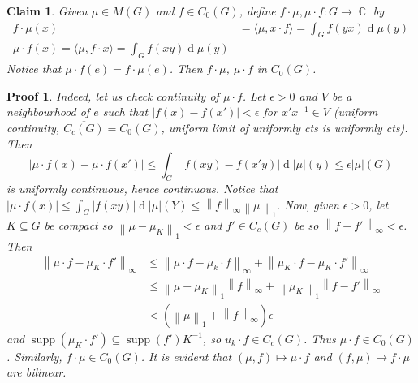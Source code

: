 \documentclass[11pt, a4paper]{memoir}
\DeclareMathOperator{\C}{{\mathbb{C}}}
\newcommand{\norm}[1]{\ensuremath{\left\lVert#1\right\rVert}}
\theoremstyle{change}
\theoremstyle{plain}
\newtheorem{claim}{Claim}
\theoremstyle{nonumberplain}
\newtheorem{nmproof}{Proof}
\DeclareMathOperator{\supp}{supp}
\renewcommand{\d}[1]{\ensuremath{\operatorname{d}\!{#1}}}
\numberwithin{equation}{section}
\begin{document}
\begin{claim}
    Given $\mu\in M(G)$ and $f\in C_0(G)$, define $f\cdot\mu,\mu\cdot f:G\to\C$ by
    \begin{align*}
        f\cdot\mu(x) &=\langle \mu,x\cdot f\rangle=\int_G f(yx)\d{\mu(y)}\\
        \mu\cdot f(x)=\langle\mu,f\cdot x\rangle=\int_Gf(xy)\d{\mu(y)}
    \end{align*}
    Notice that $\mu\cdot f(e)=f\cdot\mu(e)$.
    Then $f\cdot\mu$, $\mu\cdot f$ in $C_0(G)$.
\end{claim}
\begin{nmproof}
    Indeed, let us check continuity of $\mu\cdot f$.
    Let $\epsilon>0$ and $V$ be a neighbourhood of $e$ such that $|f(x)-f(x')|<\epsilon$ for $x'x^{-1}\in V$ (uniform continuity, $\overline{C_c(G)}=C_0(G)$, uniform limit of uniformly cts is uniformly cts).
    Then
    \begin{equation*}
        |\mu\cdot f(x)-\mu\cdot f(x')|\leq\int_G|f(xy)-f(x'y)|\d{|\mu|(y)}\leq\epsilon|\mu|(G)
    \end{equation*}
    is uniformly continuous, hence continuous.
    Notice that $|\mu\cdot f(x)|\leq\int_G|f(xy)|\d{|\mu|(Y)}\leq\norm{f}_\infty\norm{\mu}_1$.
    Now, given $\epsilon>0$, let $K\subseteq G$ be compact so $\norm{\mu-\mu_K}_1<\epsilon$ and $f'\in C_c(G)$ be so $\norm{f-f'}_\infty<\epsilon$.
    Then
    \begin{align*}
        \norm{\mu\cdot f-\mu_K\cdot f'}_\infty&\leq\norm{\mu\cdot f-\mu_k\cdot f}_\infty+\norm{\mu_K\cdot f-\mu_K\cdot f'}_\infty\\
                                              &\leq\norm{\mu-\mu_K}_1\norm{f}_\infty+\norm{\mu_K}_1\norm{f-f'}_\infty\\
                                              &< (\norm{\mu}_1+\norm{f}_\infty)\epsilon
    \end{align*}
    and $\supp(\mu_K\cdot f')\subseteq\supp(f')K^{-1}$, so $u_k\cdot f\in C_c(G)$.
    Thus $\mu\cdot f\in C_0(G)$.
    Similarly, $f\cdot\mu\in C_0(G)$.
    It is evident that $(\mu,f)\mapsto\mu\cdot f$ and $(f,\mu)\mapsto f\cdot\mu$ are bilinear.
\end{nmproof}
\end{document}
